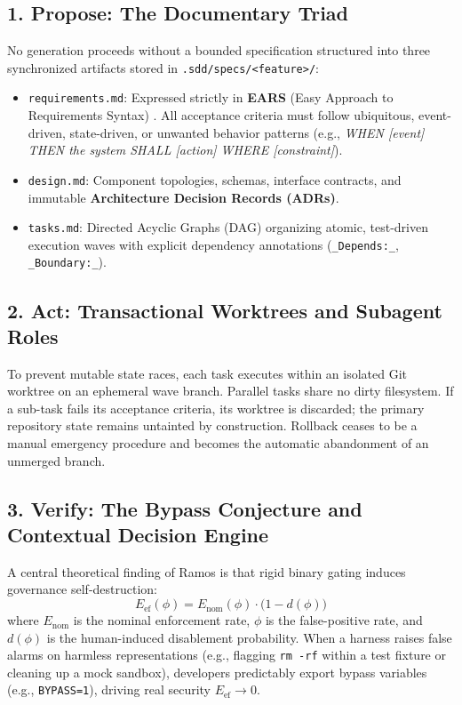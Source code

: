 \documentclass[11pt,a4paper]{article}
\begin{document}
\subsection{1. Propose: The Documentary Triad}
No generation proceeds without a bounded specification structured into three synchronized artifacts stored in \texttt{.sdd/specs/<feature>/}:
\begin{itemize}
    \item \texttt{requirements.md}: Expressed strictly in \textbf{EARS} (Easy Approach to Requirements Syntax) \cite{mavin2009ears}. All acceptance criteria must follow ubiquitous, event-driven, state-driven, or unwanted behavior patterns (e.g., \textit{WHEN [event] THEN the system SHALL [action] WHERE [constraint]}).
    \item \texttt{design.md}: Component topologies, schemas, interface contracts, and immutable \textbf{Architecture Decision Records (ADRs)}.
    \item \texttt{tasks.md}: Directed Acyclic Graphs (DAG) organizing atomic, test-driven execution waves with explicit dependency annotations (\texttt{\_Depends:\_}, \texttt{\_Boundary:\_}).
\end{itemize}

\subsection{2. Act: Transactional Worktrees and Subagent Roles}
To prevent mutable state races, each task executes within an isolated Git worktree on an ephemeral wave branch. Parallel tasks share no dirty filesystem. If a sub-task fails its acceptance criteria, its worktree is discarded; the primary repository state remains untainted by construction. Rollback ceases to be a manual emergency procedure and becomes the automatic abandonment of an unmerged branch.

\subsection{3. Verify: The Bypass Conjecture and Contextual Decision Engine}
A central theoretical finding of Ramos \cite{ramos2026zero} is that rigid binary gating induces governance self-destruction:
\begin{equation}
    E_{\text{ef}}(\phi) = E_{\text{nom}}(\phi)\cdot \bigl(1 - d(\phi)\bigr)
\end{equation}
where $E_{\text{nom}}$ is the nominal enforcement rate, $\phi$ is the false-positive rate, and $d(\phi)$ is the human-induced disablement probability. When a harness raises false alarms on harmless representations (e.g., flagging \texttt{rm -rf} within a test fixture or cleaning up a mock sandbox), developers predictably export bypass variables (e.g., \texttt{BYPASS=1}), driving real security $E_{\text{ef}} \to 0$.
\end{document}
